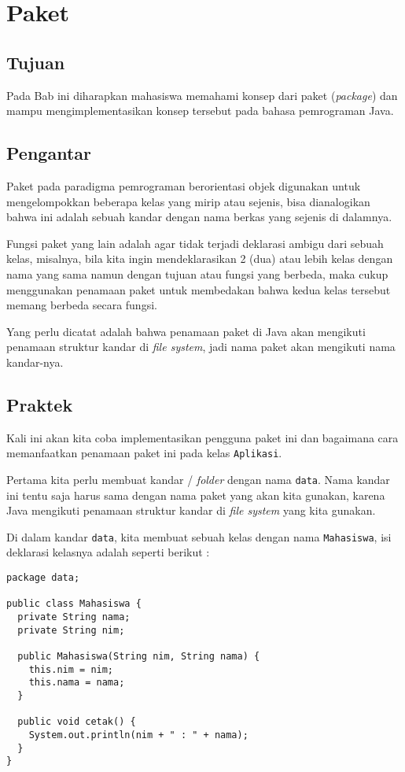 \chapter{Paket}

\section{Tujuan}

Pada Bab ini diharapkan mahasiswa memahami konsep dari paket (\textit{package}) dan mampu mengimplementasikan konsep tersebut pada bahasa pemrograman Java.

\section{Pengantar}

Paket pada paradigma pemrograman berorientasi objek digunakan untuk mengelompokkan beberapa kelas yang mirip atau sejenis, bisa dianalogikan bahwa ini adalah sebuah kandar dengan nama berkas yang sejenis di dalamnya.

Fungsi paket yang lain adalah agar tidak terjadi deklarasi ambigu dari sebuah kelas, misalnya, bila kita ingin mendeklarasikan 2 (dua) atau lebih kelas dengan nama yang sama namun dengan tujuan atau fungsi yang berbeda, maka cukup menggunakan penamaan paket untuk membedakan bahwa kedua kelas tersebut memang berbeda secara fungsi.

Yang perlu dicatat adalah bahwa penamaan paket di Java akan mengikuti penamaan struktur kandar di \textit{file system}, jadi nama paket akan mengikuti nama kandar-nya.

\section{Praktek}

Kali ini akan kita coba implementasikan pengguna paket ini dan bagaimana cara memanfaatkan penamaan paket ini pada kelas \texttt{Aplikasi}. 

Pertama kita perlu membuat kandar / \textit{folder} dengan nama \texttt{data}. Nama kandar ini tentu saja harus sama dengan nama paket yang akan kita gunakan, karena Java mengikuti penamaan struktur kandar di \textit{file system} yang kita gunakan.

Di dalam kandar \texttt{data}, kita membuat sebuah kelas dengan nama \texttt{Mahasiswa}, isi deklarasi kelasnya adalah seperti berikut :

\begin{lstlisting}
package data;

public class Mahasiswa {
  private String nama;
  private String nim;
  
  public Mahasiswa(String nim, String nama) {
    this.nim = nim;
    this.nama = nama;
  }
  
  public void cetak() {
    System.out.println(nim + " : " + nama);
  }
}
\end{lstlisting}

